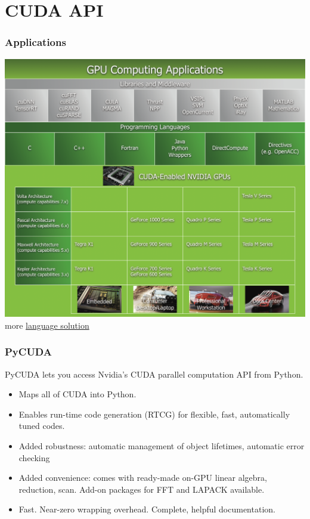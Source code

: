 \documentclass[xcolor=x11names,table]{beamer}
\begin{document}
\section{CUDA API}

\begin{frame}
\frametitle{Applications}
	\centering
	\includegraphics[scale=0.09]{refs/cuda_application.png}
	\\ more \href{https://developer.nvidia.com/language-solutions}{language solution}
\end{frame}

\begin{frame}
\frametitle{PyCUDA}
	PyCUDA lets you access Nvidia's CUDA parallel computation API from Python.
	\begin{itemize}
		\item Maps all of CUDA into Python.
		\item Enables run-time code generation (RTCG) for flexible, fast, automatically tuned codes.
		\item Added robustness: automatic management of object lifetimes, automatic error checking
		\item Added convenience: comes with ready-made on-GPU linear algebra, reduction, scan. Add-on packages for FFT and LAPACK available.
		\item Fast. Near-zero wrapping overhead.
		Complete, helpful documentation.
	\end{itemize}
\end{frame}
\end{document}
